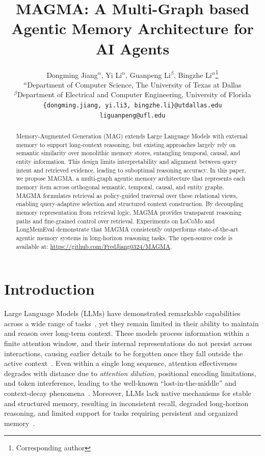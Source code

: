 \documentclass[11pt]{article}
\title{MAGMA: A Multi-Graph based Agentic Memory Architecture for AI Agents}
\author{
Dongming Jiang$^{\alpha}$, Yi Li$^{\alpha}$, Guanpeng Li$^{\beta}$, Bingzhe Li$^{\alpha}$\thanks{Corresponding author} \\
$^{\alpha}$Department of Computer Science, The University of Texas at Dallas \\
$^{\beta}$Department of Electrical and Computer Engineering, University of Florida \\
\texttt{\{dongming.jiang, yi.li3, bingzhe.li\}@utdallas.edu} \\\texttt{liguanpeng@ufl.edu}
}
\begin{document}
\maketitle

\begin{abstract}


Memory-Augmented Generation (MAG) extends Large Language Models with external memory to support long-context reasoning, but existing approaches largely rely on semantic similarity over monolithic memory stores, entangling temporal, causal, and entity information. This design limits interpretability and alignment between query intent and retrieved evidence, leading to suboptimal reasoning accuracy.
In this paper, we propose MAGMA, a multi-graph agentic memory architecture that represents each memory item across orthogonal semantic, temporal, causal, and entity graphs. MAGMA formulates retrieval as policy-guided traversal over these relational views, enabling query-adaptive selection and structured context construction. By decoupling memory representation from retrieval logic, MAGMA provides transparent reasoning paths and fine-grained control over retrieval. Experiments on LoCoMo and LongMemEval demonstrate that MAGMA consistently outperforms state-of-the-art agentic memory systems in long-horizon reasoning tasks. The open-source code is available at: \url{https://github.com/FredJiang0324/MAGMA}.


\end{abstract}
\section{Introduction}
\label{sec:intro}
Large Language Models (LLMs) have demonstrated remarkable capabilities across a wide range of tasks~\cite{Brown2020,achiam2023gpt,Wei2022}, 
yet they remain limited in their ability to maintain and reason over long-term context. 
These models process information within a finite attention window, and their internal representations do not persist across interactions, 
causing earlier details to be forgotten once they fall outside the active context~\cite{Brown2020,Beltagy2020}. 
Even within a single long sequence, attention effectiveness degrades with distance due to \textit{attention dilution}, positional encoding limitations, and token interference, leading to the well-known ``lost-in-the-middle'' and context-decay phenomena~\cite{liu2024lost,Press2021}. 
Moreover, LLMs lack native mechanisms for stable and structured memory, resulting in inconsistent recall, degraded long-horizon reasoning, and limited support for tasks requiring persistent and organized memory~\cite{Khandelwal2018,maharana2024evaluating}.
\end{document}
